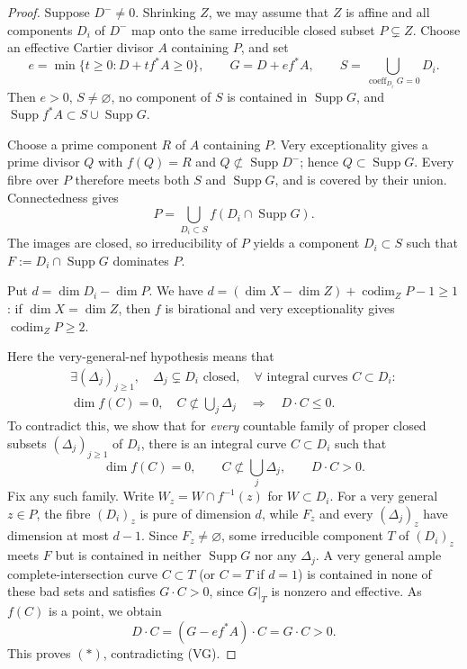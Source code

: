 \documentclass[11pt,a4paper]{article}
\DeclareMathOperator{\Supp}{Supp}
\begin{document}
\begin{proof}
Suppose $D^-\ne0$. Shrinking $Z$, we may assume that $Z$ is affine and all
components $D_i$ of $D^-$ map onto the same irreducible closed subset
$P\subsetneq Z$. Choose an effective Cartier divisor $A$ containing $P$, and set
\[
 e=\min\{t\ge0:D+t f^*A\ge0\},\qquad
 G=D+e f^*A,\qquad
 S=\bigcup_{\operatorname{coeff}_{D_i}G=0}D_i.
\]
Then $e>0$, $S\ne\varnothing$, no component of $S$ is contained in
$\Supp G$, and $\Supp f^*A\subset S\cup\Supp G$.

Choose a prime component $R$ of $A$ containing $P$. Very exceptionality
gives a prime divisor $Q$ with $f(Q)=R$ and $Q\not\subset\Supp D^-$;
hence $Q\subset\Supp G$. Every fibre over $P$ therefore meets both $S$
and $\Supp G$, and is covered by their union. Connectedness gives
\[
 P=\bigcup_{D_i\subset S}f(D_i\cap\Supp G).
\]
The images are closed, so irreducibility of $P$ yields a component
$D_i\subset S$ such that $F:=D_i\cap\Supp G$ dominates $P$.

Put $d=\dim D_i-\dim P$. We have
$d=(\dim X-\dim Z)+\operatorname{codim}_ZP-1\ge1$:
if $\dim X=\dim Z$, then $f$ is birational and very exceptionality gives
$\operatorname{codim}_ZP\ge2$.

Here the very-general-nef hypothesis means that
\[
\begin{gathered}
 \exists(\Delta_j)_{j\ge1},\quad \Delta_j\subsetneq D_i\text{ closed},
 \quad\forall\text{ integral curves }C\subset D_i:\\
 \dim f(C)=0,\quad C\not\subset\bigcup_j\Delta_j
 \quad\Longrightarrow\quad D\cdot C\le0.
\end{gathered}
\tag{VG}
\]
To contradict this, we show that for \emph{every} countable family of proper
closed subsets $(\Delta_j)_{j\ge1}$ of $D_i$, there is an integral curve
$C\subset D_i$ such that
\[
 \dim f(C)=0,\qquad C\not\subset\bigcup_j\Delta_j,
 \qquad D\cdot C>0.
\tag{$*$}
\]
Fix any such family. Write $W_z=W\cap f^{-1}(z)$ for $W\subset D_i$.
For a very general $z\in P$, the fibre
$(D_i)_z$ is pure of dimension $d$, while $F_z$ and every $(\Delta_j)_z$
have dimension at most $d-1$. Since $F_z\ne\varnothing$, some irreducible
component $T$ of $(D_i)_z$ meets $F$ but is contained in neither $\Supp G$
nor any $\Delta_j$. A very general ample complete-intersection curve
$C\subset T$ (or $C=T$ if $d=1$) is contained in none of these bad sets
and satisfies $G\cdot C>0$, since $G|_T$ is nonzero and effective.
As $f(C)$ is a point, we obtain
\[
 D\cdot C=(G-e f^*A)\cdot C=G\cdot C>0.
\]
This proves $(*)$, contradicting (VG).
\end{proof}
\end{document}
